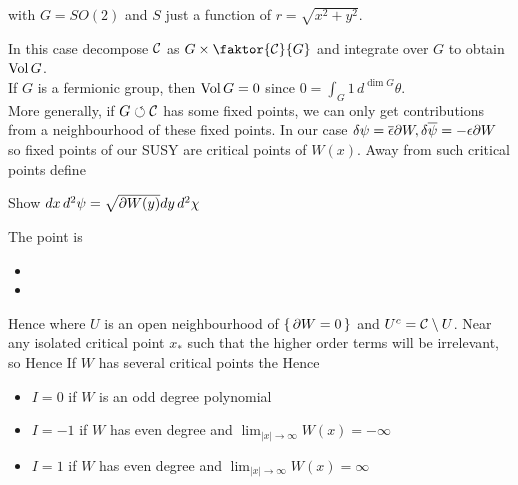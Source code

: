 \documentclass{article}
\begin{document}
\begin{example}
with $G=SO(2)$ and $S$ just a function of $r=\sqrt{x^2+y^2}$. 
\end{example}
In this case decompose $\mathcal{C}$ as $G \times \faktor{\mc{C}}{G}$ and integrate over $G$ to obtain $\operatorname{Vol} G$. \\
If $G$ is a fermionic group, then $\operatorname{Vol} G = 0$ since $0 = \int_G 1 \, d^{\dim G} \theta$.\\
More generally, if $G \circlearrowleft \mathcal{C}$ has some fixed points, we can only get contributions from a neighbourhood of these fixed points. In our case $\delta \psi = \overline{\epsilon} \partial W, \delta \overline{\psi} = -\epsilon \partial W$ so fixed points of our SUSY are critical points of $W(x)$. Away from such critical points define 
\begin{ex}
Show $dx\, d^2 \psi = \sqrt{\partial W(y)} dy \, d^2\chi$
\end{ex}
The point is
\begin{itemize}
\item {} 
\item {}
\end{itemize}
Hence 
where $U$ is an open neighbourhood of $\set{ \partial W = 0}$ and $U^c = \mathcal{C}\setminus U$. Near any isolated critical point $x_\ast$ such that 
the higher order terms will be irrelevant, so 
Hence 
If $W$ has several critical points the 
Hence 
\begin{itemize}
    \item $I=0$ if $W$ is an odd degree polynomial
    \item $I=-1$ if $W$ has even degree and $\lim_{|x|\to\infty} W(x) = -\infty$
    \item $I=1$ if $W$ has even degree and $\lim_{|x|\to\infty} W(x) = \infty$
\end{itemize}
\end{document}

